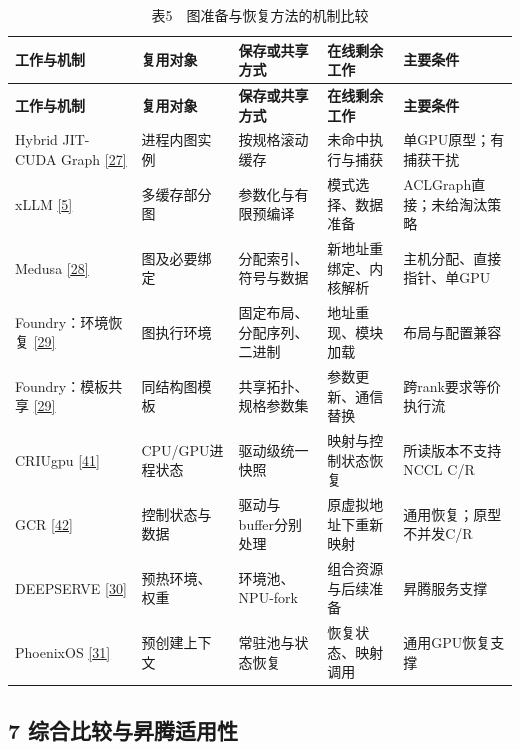 \documentclass[UTF8,11pt,fontset=windows]{ctexart}
\begin{document}
\begingroup\small
\begin{longtable}[]{@{}>{\raggedright\arraybackslash}p{}>{\raggedright\arraybackslash}p{}>{\raggedright\arraybackslash}p{}>{\raggedright\arraybackslash}p{}>{\raggedright\arraybackslash}p{}@{}}
\caption{表5　图准备与恢复方法的机制比较}\tabularnewline
\toprule
\textbf{工作与机制} & \textbf{复用对象} & \textbf{保存或共享方式} & \textbf{在线剩余工作} & \textbf{主要条件} \\
\midrule
\endfirsthead
\toprule
\textbf{工作与机制} & \textbf{复用对象} & \textbf{保存或共享方式} & \textbf{在线剩余工作} & \textbf{主要条件} \\
\midrule
\endhead
Hybrid JIT-CUDA Graph \protect\hyperlink{ref-27}{{[}27{]}} & 进程内图实例 & 按规格滚动缓存 & 未命中执行与捕获 & 单GPU原型；有捕获干扰 \\
xLLM \protect\hyperlink{ref-5}{{[}5{]}} & 多缓存部分图 & 参数化与有限预编译 & 模式选择、数据准备 & ACLGraph直接；未给淘汰策略 \\
Medusa \protect\hyperlink{ref-28}{{[}28{]}} & 图及必要绑定 & 分配索引、符号与数据 & 新地址重绑定、内核解析 & 主机分配、直接指针、单GPU \\
Foundry：环境恢复 \protect\hyperlink{ref-29}{{[}29{]}} & 图执行环境 & 固定布局、分配序列、二进制 & 地址重现、模块加载 & 布局与配置兼容 \\
Foundry：模板共享 \protect\hyperlink{ref-29}{{[}29{]}} & 同结构图模板 & 共享拓扑、规格参数集 & 参数更新、通信替换 & 跨rank要求等价执行流 \\
CRIUgpu \protect\hyperlink{ref-41}{{[}41{]}} & CPU/GPU进程状态 & 驱动级统一快照 & 映射与控制状态恢复 & 所读版本不支持NCCL C/R \\
GCR \protect\hyperlink{ref-42}{{[}42{]}} & 控制状态与数据 & 驱动与buffer分别处理 & 原虚拟地址下重新映射 & 通用恢复；原型不并发C/R \\
DEEPSERVE \protect\hyperlink{ref-30}{{[}30{]}} & 预热环境、权重 & 环境池、NPU-fork & 组合资源与后续准备 & 昇腾服务支撑 \\
PhoenixOS \protect\hyperlink{ref-31}{{[}31{]}} & 预创建上下文 & 常驻池与状态恢复 & 恢复状态、映射调用 & 通用GPU恢复支撑 \\
\bottomrule
\end{longtable}
\endgroup

\hypertarget{section-7}{%
\subsection{7 综合比较与昇腾适用性}\label{section-7}}
\end{document}
